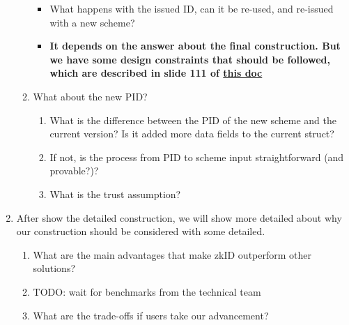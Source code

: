 \documentclass{iacrtrans}
\begin{document}
\begin{enumerate}
\begin{enumerate}
\begin{itemize}
            \item What happens with the issued ID, can it be re-used, and re-issued with a new scheme?
            \item \textbf{It depends on the answer about the final construction. But we have some design constraints that should be followed, which are described in slide 111 of \href{https://docs.google.com/presentation/d/1C4D8zK4gAdafgIEW-2m_qDyyT39gWo0mmFYpwmA8N3M/edit?slide=id.g338a079cb64_0_31\#slide=id.g338a079cb64_0_31}{this doc}} 
        \end{itemize} 
        \item What about the new PID?
        \begin{enumerate}
            \item What is the difference between the PID of the new scheme and the current version? Is it added more data fields to the current struct?
            \item If not, is the process from PID to scheme input straightforward (and provable?)?
            \item What is the trust assumption?
        \end{enumerate}
    \end{enumerate}
    \item After show the detailed construction, we will show more detailed about why our construction should be considered with some detailed.
    \begin{enumerate}
        \item What are the main advantages that make zkID outperform other solutions? 
            \item TODO: wait for benchmarks from the technical team 
        \item What are the trade-offs if users take our advancement?
    \end{enumerate}
\end{enumerate}



\end{document}
